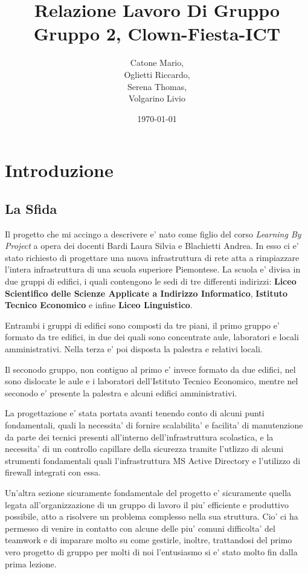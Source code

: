 \documentclass{report}
\author{Catone Mario,\\
    Oglietti Riccardo,\\
    Serena Thomas,\\
    Volgarino Livio}
\title{Relazione Lavoro Di Gruppo\\
\large Gruppo 2, Clown-Fiesta-ICT}
\date{\today}
\begin{document}
    \maketitle
    \tableofcontents
    \chapter{Introduzione}
        \section{La Sfida}
            Il progetto che mi accingo a descrivere e' nato come figlio del corso \emph{Learning By Project} a opera dei docenti 
             Bardi Laura Silvia e Blachietti Andrea. In esso ci e' stato richiesto di progettare una nuova infrastruttura di 
             rete atta a rimpiazzare l'intera infrastruttura di una scuola superiore Piemontese. La scuola e' divisa in due 
             gruppi di edifici, i quali contengono le sedi di tre differenti indirizzi: \textbf{Liceo Scientifico delle Scienze 
             Applicate a Indirizzo Informatico}, \textbf{Istituto Tecnico Economico} e infine \textbf{Liceo Linguistico}.

            Entrambi i gruppi di edifici sono composti da tre piani, il primo gruppo e' formato da tre edifici, in due 
             dei quali sono concentrate aule, laboratori e locali amministrativi. Nella terza e' poi disposta la palestra
             e relativi locali.

            Il seconodo gruppo, non contiguo al primo e' invece formato da due edifici, nel sono dislocate le aule e 
             i laboratori dell'Istituto Tecnico Economico, mentre nel seconodo e' presente la palestra e alcuni edifici
             amministrativi.

            La progettazione e' stata portata avanti tenendo conto di alcuni punti fondamentali, quali la necessita' di 
             fornire scalabilita' e facilita' di manutenzione da parte dei tecnici presenti all'interno dell'infrastruttura 
             scolastica, e la necessita' di un controllo capillare della sicurezza tramite l'utlizzo di alcuni strumenti 
             fondamentali quali l'infrastruttura MS Active Directory e l'utilizzo di firewall integrati con essa. 

            Un'altra sezione sicuramente fondamentale del progetto e' sicuramente quella legata all'organizzazione di un 
             gruppo di lavoro il piu' efficiente e produttivo possibile, atto a risolvere un problema complesso nella sua 
             struttura. Cio' ci ha permesso di venire in contatto con alcune delle piu' comuni difficolta' del teamwork 
             e di imparare molto su come gestirle, inoltre, trattandosi del primo vero progetto di gruppo per molti di noi 
             l'entusiasmo si e' stato molto fin dalla prima lezione.
\end{document}
